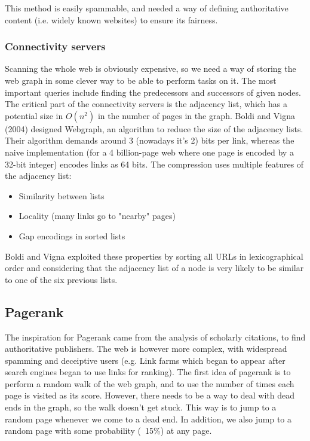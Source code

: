 This method is easily spammable, and needed a way of defining authoritative content (i.e. widely known websites) to ensure its fairness.

\subsubsection{Connectivity servers}

Scanning the whole web is obviously expensive, so we need a way of storing the web graph in some clever way to be able to perform tasks on it.
The most important queries include finding the predecessors and successors of given nodes.
The critical part of the connectivity servers is the adjacency list, which has a potential size in $O(n^2)$ in the number of pages in the graph.
Boldi and Vigna (2004) designed Webgraph, an algorithm to reduce the size of the adjacency lists. Their algorithm demands around 3 (nowadays it's 2) bits per link, whereas the naive implementation (for a 4 billion-page web where one page is encoded by a 32-bit integer) encodes links as 64 bits.
The compression uses multiple features of the adjacency list:
\begin{itemize}
\item Similarity between lists
\item Locality (many links go to "nearby" pages)
\item Gap encodings in sorted lists
\end{itemize}
Boldi and Vigna exploited these properties by sorting all URLs in lexicographical order and considering that the adjacency list of a node is very likely to be similar to one of the six previous lists.

\subsection{Pagerank}

The inspiration for Pagerank came from the analysis of scholarly citations, to find authoritative publishers. The web is however more complex, with widespread spamming and deceiptive users (e.g. Link farms which began to appear after search engines began to use links for ranking).
The first idea of pagerank is to perform a random walk of the web graph, and to use the number of times each page is visited as its score. However, there needs to be a way to deal with dead ends in the graph, so the walk doesn't get stuck.
This way is to jump to a random page whenever we come to a dead end. In addition, we also jump to a random page with some probability (~15\%) at any page.

